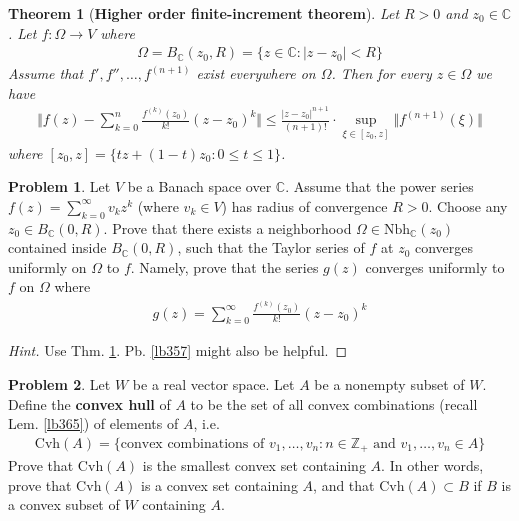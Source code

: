 \documentclass[12pt,b5paper,notitlepage]{article}
\theoremstyle{definition}
\newtheorem{prob}{\color{red}Problem}[section]
\theoremstyle{plain}
\newtheorem{thm}[df]{Theorem}
\newcommand{\Cbb}{\mathbb C}
\newcommand{\Zbb}{\mathbb Z}
\newcommand{\Nbh}{\mathrm{Nbh}}
\numberwithin{equation}{section}
\begin{document}
\begin{thm}[\textbf{Higher order finite-increment theorem}]  \label{lb356}
Let $R>0$ and $z_0\in\Cbb$. Let $f:\Omega\rightarrow V$ where
\begin{align*}
\Omega=B_\Cbb(z_0,R)=\{z\in\Cbb:|z-z_0|<R\}
\end{align*}
Assume that $f',f'',\dots,f^{(n+1)}$ exist everywhere on $\Omega$. Then for every $z\in\Omega$ we have
\begin{align}
\Big\Vert f(z)-\sum_{k=0}^n\frac{f^{(k)}(z_0)}{k!}(z-z_0)^k \Big\Vert \leq\frac{|z-z_0|^{n+1}}{(n+1)!}\cdot \sup_{\xi\in[z_0,z]} \Vert f^{(n+1)}(\xi)\Vert
\end{align}
where $[z_0,z]=\{tz+(1-t)z_0:0\leq t\leq 1\}$.
\end{thm}



\begin{prob}
Let $V$ be a Banach space over $\Cbb$. Assume that the power series $f(z)=\sum_{k=0}^\infty v_kz^k$ (where $v_k\in V$) has radius of convergence $R>0$. Choose any $z_0\in B_\Cbb(0,R)$. Prove that there exists a neighborhood $\Omega\in\Nbh_\Cbb(z_0)$ contained inside $B_\Cbb(0,R)$, such that the Taylor series of $f$ at $z_0$ converges uniformly on $\Omega$ to $f$. Namely, prove that the series $g(z)$ converges uniformly to $f$ on $\Omega$ where
\begin{align}
g(z)=\sum_{k=0}^\infty\frac{f^{(k)}(z_0)}{k!}(z-z_0)^k
\end{align}
\end{prob}

\begin{proof}[Hint]
Use Thm. \ref{lb356}.  Pb.  \ref{lb357} might also be helpful.
\end{proof}




\begin{prob}
Let $W$ be a real vector space. Let $A$ be a nonempty subset of $W$. Define the \textbf{convex hull}  of $A$ to be the set of all convex combinations (recall Lem. \ref{lb365}) of elements of $A$, i.e.
\begin{align}
\mathrm{Cvh}(A)=\big\{\text{convex combinations of }v_1,\dots,v_n:n\in\Zbb_+\text{ and } v_1,\dots,v_n\in A\big\}
\end{align}
Prove that $\mathrm{Cvh}(A)$ is the smallest convex set containing $A$. In other words, prove that $\mathrm{Cvh}(A)$ is a convex set containing $A$, and that $\mathrm{Cvh}(A)\subset B$ if $B$ is a convex subset of $W$ containing $A$.
\end{prob}
\end{document}
